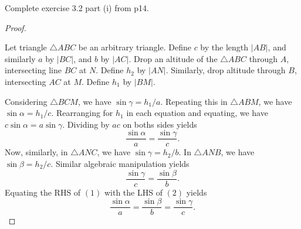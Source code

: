 \documentclass[12pt]{article}
\begin{document}
\begin{question}
    Complete exercise 3.2 part (i) from p14.
\end{question}


\begin{proof}
    {}\ 


    Let triangle $\triangle ABC$ be an arbitrary triangle.
    Define $c$ by the length $|AB|$,
    and similarly $a$ by $|BC|$, and $b$ by $|AC|$.
    Drop an altitude of the $\triangle ABC$ through $A$,
    intersecting line $BC$ at $N$. Define $h_{2}$ by $|AN|$.
    Similarly, drop altitude through $B$,
    intersecting $AC$ at $M$. Define $h_{1}$ by $|BM|$.

    Considering $\triangle BCM$, we have $\sin\gamma = h_{1}/a$.
    Repeating this in $\triangle ABM$, we have $\sin\alpha = h_{1}/c$.
    Rearranging for $h_{1}$ in each equation and equating,
    we have $c\sin\alpha = a\sin\gamma $. 
    Dividing by $ac$ on boths sides yields
    \begin{equation}
    \frac{\sin\alpha }{a} = \frac{\sin\gamma }{c}.
    \end{equation}
    Now, similarly,
    in $\triangle ANC$, we have $\sin\gamma = h_{2}/b$.
    In $\triangle ANB$, we have $\sin\beta = h_{2}/c$.
    Similar algebraic manipulation yields
    \begin{equation}
    \frac{\sin\gamma }{c} = \frac{\sin\beta }{b}.
    \end{equation}
    Equating the RHS of $(1)$ with the LHS of $(2)$ yields
    \[
    \frac{\sin\alpha }{a} = \frac{\sin\beta }{b} = \frac{\sin\gamma }{c}.
    \]
\end{proof}
\end{document}
